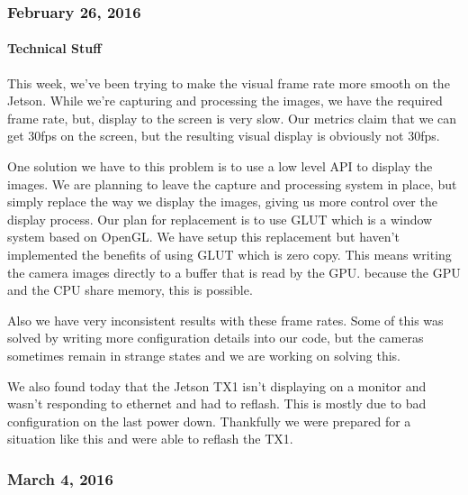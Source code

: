 \subsubsection{February 26, 2016}
\paragraph{Technical Stuff}
This week, we've been trying to make the visual frame rate more smooth on the Jetson. While we're capturing and processing the images, we have the required frame rate, but, display to the screen is very slow. Our metrics claim that we can get 30fps on the screen, but the resulting visual display is obviously not 30fps.
\par
One solution we have to this problem is to use a low level API to display the images. We are planning to leave the capture and processing system in place, but simply replace the way we display the images, giving us more control over the display process. Our plan for replacement is to use GLUT which is a window system based on OpenGL. We have setup this replacement but haven't implemented the benefits of using GLUT which is zero copy. This means writing the camera images directly to a buffer that is read by the GPU. because the GPU and the CPU share memory, this is possible.
\par
Also we have very inconsistent results with these frame rates. Some of this was solved by writing more configuration details into our code, but the cameras sometimes remain in strange states and we are working on solving this.
\par
We also found today that the Jetson TX1 isn't displaying on a monitor and wasn't responding to ethernet and had to reflash. This is mostly due to bad configuration on the last power down. Thankfully we were prepared for a situation like this and were able to reflash the TX1.\\

\subsubsection{March 4, 2016}
